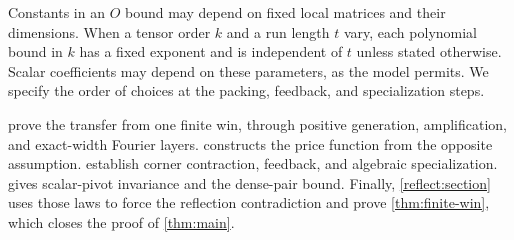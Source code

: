 Constants in an $O$ bound may depend on fixed local matrices and their
dimensions. When a tensor order $k$ and a run length $t$ vary, each
polynomial bound in $k$ has a fixed exponent and is independent of $t$
unless stated otherwise. Scalar coefficients may depend on these
parameters, as the model permits. We specify the order of choices at
the packing, feedback, and specialization steps.

 prove the transfer from one finite
win, through positive generation, amplification, and exact-width Fourier
layers.  constructs the price function from the
opposite assumption.  establish
corner contraction, feedback, and algebraic specialization.
 gives scalar-pivot invariance and the dense-pair
bound. Finally, \cref{reflect:section} uses those laws to force the
reflection contradiction and prove \cref{thm:finite-win}, which closes
the proof of \cref{thm:main}.
